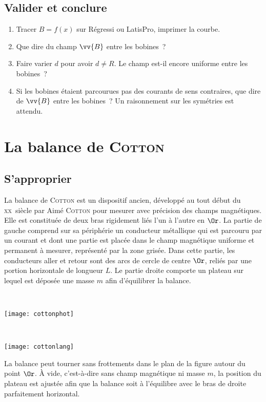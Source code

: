\documentclass[a4paper, 11pt, final, garamond]{book}
\begin{document}
\subsection{Valider et conclure}
\label{ssec:helmval}
\begin{enumerate}[label=\sqenumi, start=2]
  \item Tracer $B = f(x)$ sur Régressi ou LatisPro, imprimer la courbe.
  \item Que dire du champ $\vv{B}$ entre les bobines~?
  \item Faire varier $d$ pour avoir $d \neq R$. Le champ est-il encore uniforme
    entre les bobines~?
  \item Si les bobines étaient parcourues pas des courants de sens contraires,
    que dire de $\vv{B}$ entre les bobines~? Un raisonnement sur les symétries
    est attendu.
\end{enumerate}

\section{La balance de \textsc{Cotton}}
\label{sec:cotton}
\subsection{S'approprier}
\label{ssec:cottonapp}

La balance de \textsc{Cotton} est un dispositif ancien, développé au tout début
du \textsc{xx}\ieme~siècle par Aimé \textsc{Cotton} pour mesurer avec précision
des champs magnétiques. Elle est constituée de deux bras rigidement liés l'un à
l'autre en $\Or$. La partie de gauche comprend sur sa périphérie un conducteur
métallique qui est parcouru par un courant et dont une partie est placée dans le
champ magnétique uniforme et permanent à mesurer, représenté par la zone grisée.
Dans cette partie, les conducteurs aller et retour sont des arcs de cercle de
centre $\Or$, reliés par une portion horizontale de longueur $L$. Le partie
droite comporte un plateau sur lequel est déposée une masse $m$ afin
d’équilibrer la balance.

\noindent
\begin{minipage}[t]{.45\linewidth}
  ~
  \begin{center}
    \texttt{[image: cottonphot]}
    \label{fig:cottonphot}
  \end{center}
\end{minipage}
\hfill
\begin{minipage}[t]{.45\linewidth}
  ~
  \begin{center}
    \texttt{[image: cottonlang]}
    \label{fig:cottonlang}
  \end{center}
\end{minipage}
\bigbreak
La balance peut tourner sans frottements dans le plan de la figure autour du
point $\Or$. À vide, c'est-à-dire sans champ magnétique ni masse $m$, la
position du plateau est ajustée afin que la balance soit à l'équilibre avec le
bras de droite parfaitement horizontal.
\end{document}
